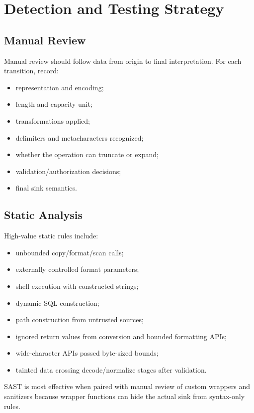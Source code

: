 \documentclass[11pt]{article}
\begin{document}
\section{Detection and Testing Strategy}

\subsection{Manual Review}

Manual review should follow data from origin to final interpretation. For each transition, record:

\begin{itemize}
  \item representation and encoding;
  \item length and capacity unit;
  \item transformations applied;
  \item delimiters and metacharacters recognized;
  \item whether the operation can truncate or expand;
  \item validation/authorization decisions;
  \item final sink semantics.
\end{itemize}

\subsection{Static Analysis}

High-value static rules include:

\begin{itemize}
  \item unbounded copy/format/scan calls;
  \item externally controlled format parameters;
  \item shell execution with constructed strings;
  \item dynamic SQL construction;
  \item path construction from untrusted sources;
  \item ignored return values from conversion and bounded formatting APIs;
  \item wide-character APIs passed byte-sized bounds;
  \item tainted data crossing decode/normalize stages after validation.
\end{itemize}

SAST is most effective when paired with manual review of custom wrappers and sanitizers because wrapper functions can hide the actual sink from syntax-only rules.
\end{document}
